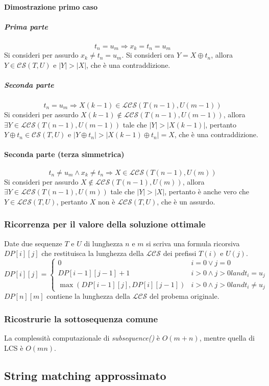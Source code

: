 \paragraph{Dimostrazione primo caso}
\subparagraph{Prima parte}
$$t_n = u_m \Rightarrow x_k = t_n = u_m$$
Si consideri per assurdo $x_k \neq t_n = u_m$. Si consideri ora $Y= X\oplus t_n$, allora $Y\in\mathcal{CS}(T, U)$ e $|Y|>|X|$, che \`e una contraddizione.
\subparagraph{Seconda parte}
$$t_n = u_m \Rightarrow X(k-1)\in\mathcal{LCS}(T(n-1), U(m-1))$$
Si consideri per assurdo $X(k-1)\not\in\mathcal{LCS}(T(n-1), U(m-1))$, allora $\exists Y\in\mathcal{LCS}(T(n-1), U(m-1))$ tale che $|Y|>|X(k-1)|$, pertanto
$Y\oplus t_n\in\mathcal{CS}(T, U)$ e $|Y\oplus t_n|>|X(k-1)\oplus t_n|=X$, che \`e una contraddizione. 
\paragraph{Seconda parte (terza simmetrica)}
$$t_n\neq u_m\land x_k\neq t_n \Rightarrow X\in \mathcal{LCS}(T(n-1), U(m))$$
Si consideri per assurdo $X\not\in \mathcal{LCS}(T(n-1), U(m))$, allora $\exists Y\in\mathcal{LCS}(T(n-1), U(m))$ tale che $|Y|>|X|$, pertanto \`e anche
vero che $Y\in \mathcal{LCS}(T, U)$, pertanto $X$ non \`e $\mathcal{LCS}(T, U)$, che \`e un assurdo. 
\subsubsection{Ricorrenza per il valore della soluzione ottimale}
Date due sequenze $T$ e $U$ di lunghezza $n$ e $m$ si scriva una formula ricorsiva $DP[i][j]$ che restituisca la lunghezza della $\mathcal{LCS}$ dei 
prefissi $T(i)$ e $U(j)$.
$$
DP[i][j] = 
\begin{cases}
0 & i = 0\lor j = 0\\
DP[i-1][j-1]+1 & i > 0 \land j > 0 land t_i = u_j\\
\max(DP[i - 1][j], DP[i][j - 1]) & i > 0 \land j > 0 land t_i \neq u_j
\end{cases}
$$ 
$DP[n][m]$ contiene la lunghezza della $\mathcal{LCS}$ del probema originale. \\

\subsubsection{Ricostrurie la sottosequenza comune}

La complessit\`a computazionale di \emph{subsequence()} \`e $O(m+n)$, mentre quella di LCS \`e $O(mn)$. 
\subsection{String matching approssimato}
